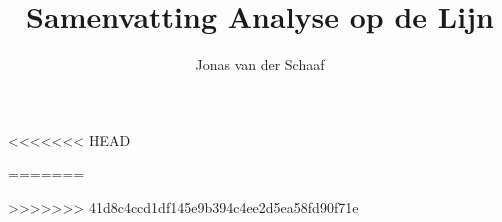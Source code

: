 \documentclass{article}
\title{Samenvatting Analyse op de Lijn}
\author{Jonas van der Schaaf}
\begin{document}
\maketitle

\tableofcontents

\newpage

<<<<<<< HEAD






=======




>>>>>>> 41d8c4ccd1df145e9b394c4ee2d5ea58fd90f71e
\end{document}

